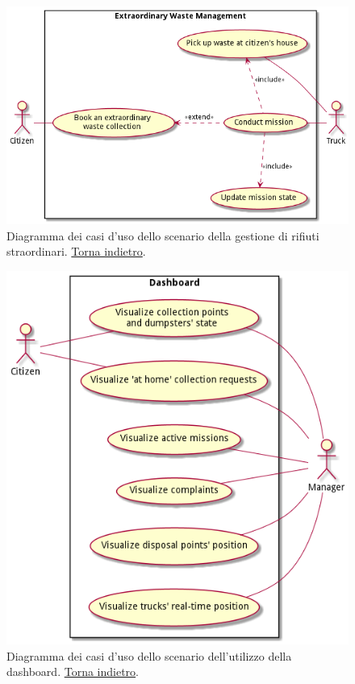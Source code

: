 \begin{figure}[H]
    \centering
    \includegraphics[width=\textwidth]{../img/extraordinary-management-use-cases.pm}
    \caption{Diagramma dei casi d'uso dello scenario della gestione di rifiuti straordinari. \hyperlink{back:extraordinary-management-use-cases}{Torna indietro}.}
    \label{fig:extraordinary-management-use-cases}
\end{figure}

\begin{figure}[H]
    \centering
    \includegraphics[width=\textwidth]{../img/dashboard-use-cases.pm}
    \caption{Diagramma dei casi d'uso dello scenario dell'utilizzo della dashboard. \hyperlink{back:dashboard-use-cases}{Torna indietro}.}
    \label{fig:dashboard-use-cases}
\end{figure}

